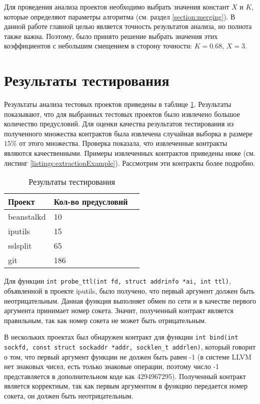 Для проведения анализа проектов необходимо выбрать значения констант $X$ и $K$, которые определяют параметры алгоритма (см. раздел \ref{section:merging}). В данной работе главной целью является точность результатов анализа, но полнота также важна. Поэтому, было принято решение выбрать значения этих коэффициентов с небольшим смещением в сторону точности: $K=0.68$, $X=3$.

\section{Результаты тестирования}
Результаты анализа тестовых проектов приведены в таблице \ref{table:testing}. Результаты показывают, что для выбранных тестовых проектов было извлечено большое количество предусловий. Для оценки качества результатов тестирования из полученного множества контрактов была извлечена случайная выборка в размере $15\%$ от этого множества. Проверка показала, что извлеченные контракты являются качественными. Примеры извлеченных контрактов приведены ниже (см. листинг \ref{listings:extractionExample}). Рассмотрим эти контракты более подробно.

\begin{table}
	\caption{Результаты тестирования}
	\begin{center}
	\begin{tabular}{|l|l|l|}
	\hline 
	\textbf{Проект} & \textbf{Кол-во предусловий}	\\ 
	\hline 
	beanstalkd & 10 \\ 
	\hline 
	iputils & 15  \\ 
	\hline 
	sslsplit & 65 \\
	\hline 
	git & 186 \\ 
	\hline 
	\end{tabular} 
	\end{center}
	\label{table:testing}
\end{table}

Для функции \texttt{int probe_ttl(int fd, struct addrinfo *ai, int ttl)}, объявленной в проекте iputils, было получено, что первый аргумент должен быть неотрицательным. Данная функция выполняет обмен по сети и в качестве первого аргумента принимает номер сокета. Значит, полученный контракт является правильным, так как номер сокета не может быть отрицательным.

В нескольких проектах был обнаружен контракт для функции \texttt{int bind(int sockfd, const struct sockaddr *addr, socklen_t addrlen)}, который говорит о том, что первый аргумент функции не должен быть равен -1 (в системе LLVM нет знаковых чисел, есть только знаковые операции, поэтому число -1 представляется в дополнительном коде как 4294967295). Полученный контракт является корректным, так как первым аргументом в функцию передается номер сокета, он должен быть неотрицательным.

